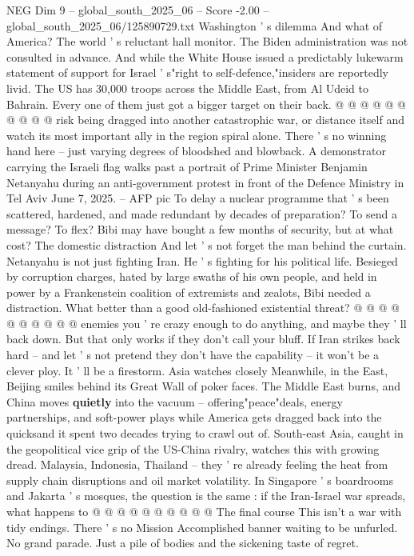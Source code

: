 \begin{textsample}{NEG Dim 9 – global\_south\_2025\_06 – Score -2.00 – global\_south\_2025\_06/125890729.txt}
Washington ' s dilemma And what of America?
The world ' s reluctant hall monitor.
The Biden administration was not consulted in advance.
And while the White House issued a predictably lukewarm statement of support for Israel ' s"right to self-defence,"insiders are reportedly livid.
The US has 30,000 troops across the Middle East, from Al Udeid to Bahrain.
Every one of them just got a bigger target on their back. @ @ @ @ @ @ @ @ @ @ risk being dragged into another catastrophic war, or distance itself and watch its most important ally in the region spiral alone.
There ' s no winning hand here -- just varying degrees of bloodshed and blowback.
A demonstrator carrying the Israeli flag walks past a portrait of Prime Minister Benjamin Netanyahu during an anti-government protest in front of the Defence Ministry in Tel Aviv June 7, 2025. -- AFP pic To delay a nuclear programme that ' s been scattered, hardened, and made redundant by decades of preparation?
To send a message?
To flex?
Bibi may have bought a few months of security, but at what cost?
The domestic distraction And let ' s not forget the man behind the curtain.
Netanyahu is not just fighting Iran.
He ' s fighting for his political life.
Besieged by corruption charges, hated by large swaths of his own people, and held in power by a Frankenstein coalition of extremists and zealots, Bibi needed a distraction.
What better than a good old-fashioned existential threat? @ @ @ @ @ @ @ @ @ @ enemies you ' re crazy enough to do anything, and maybe they ' ll back down.
But that only works if they don't call your bluff.
If Iran strikes back hard -- and let ' s not pretend they don't have the capability -- it won't be a clever ploy.
It ' ll be a firestorm.
Asia watches closely Meanwhile, in the East, Beijing smiles behind its Great Wall of poker faces.
The Middle East burns, and China moves \textbf{quietly} into the vacuum -- offering"peace"deals, energy partnerships, and soft-power plays while America gets dragged back into the quicksand it spent two decades trying to crawl out of.
South-east Asia, caught in the geopolitical vice grip of the US-China rivalry, watches this with growing dread.
Malaysia, Indonesia, Thailand -- they ' re already feeling the heat from supply chain disruptions and oil market volatility.
In Singapore ' s boardrooms and Jakarta ' s mosques, the question is the same : if the Iran-Israel war spreads, what happens to @ @ @ @ @ @ @ @ @ @ The final course This isn't a war with tidy endings.
There ' s no Mission Accomplished banner waiting to be unfurled.
No grand parade.
Just a pile of bodies and the sickening taste of regret.

\end{textsample}
